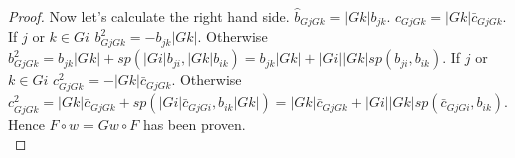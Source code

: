 \begin{proof}
\indent Now let's calculate the right hand side. $\hat{b}_{GjGk}=|Gk|b_{jk}$. $\hat{c}_{GjGk}=|Gk|\bar{c}_{GjGk}$. If $j$ or $k\in Gi$ $b^2_{GjGk}=-b_{jk}|Gk|$. Otherwise $b^2_{GjGk}=b_{jk}|Gk|+sp(|Gi|b_{ji}, |Gk|b_{ik})=b_{jk}|Gk|+|Gi||Gk|sp(b_{ji}, b_{ik})$. If $j$ or $k\in Gi$ $c^2_{GjGk}=-|Gk|\bar{c}_{GjGk}$. Otherwise $c^2_{GjGk}=|Gk|\bar{c}_{GjGk}+sp(|Gi|\bar{c}_{GjGi},b_{ik}|Gk|)=|Gk|\bar{c}_{GjGk}+|Gi||Gk|sp(\bar{c}_{GjGi},b_{ik})$.\\
\indent Hence $F\circ w=Gw\circ F$ has been proven.\\
\end{proof}
